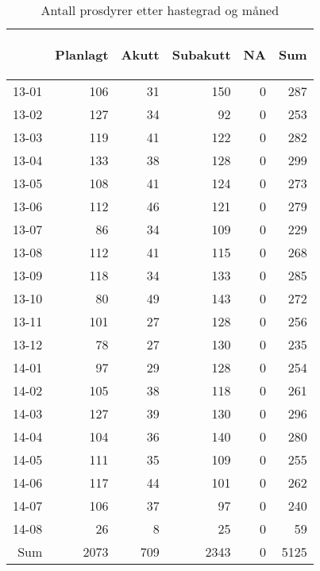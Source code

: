 \documentclass[presentation,xcolor=pdftex,dvipsnames,table]{beamer}
\begin{document}
\begin{frame}
\begin{tiny}
\begin{table}[ht]
\centering
\begin{tabular}{rrrrrr}
  \toprule
 & \begin{sideways} Planlagt \end{sideways} & \begin{sideways} Akutt \end{sideways} & \begin{sideways} Subakutt \end{sideways} & \begin{sideways} NA \end{sideways} & \begin{sideways} Sum \end{sideways} \\ 
  \midrule
13-01 & 106 & 31 & 150 & 0 & 287 \\ 
  13-02 & 127 & 34 & 92 & 0 & 253 \\ 
  13-03 & 119 & 41 & 122 & 0 & 282 \\ 
  13-04 & 133 & 38 & 128 & 0 & 299 \\ 
  13-05 & 108 & 41 & 124 & 0 & 273 \\ 
  13-06 & 112 & 46 & 121 & 0 & 279 \\ 
  13-07 & 86 & 34 & 109 & 0 & 229 \\ 
  13-08 & 112 & 41 & 115 & 0 & 268 \\ 
  13-09 & 118 & 34 & 133 & 0 & 285 \\ 
  13-10 & 80 & 49 & 143 & 0 & 272 \\ 
  13-11 & 101 & 27 & 128 & 0 & 256 \\ 
  13-12 & 78 & 27 & 130 & 0 & 235 \\ 
  14-01 & 97 & 29 & 128 & 0 & 254 \\ 
  14-02 & 105 & 38 & 118 & 0 & 261 \\ 
  14-03 & 127 & 39 & 130 & 0 & 296 \\ 
  14-04 & 104 & 36 & 140 & 0 & 280 \\ 
  14-05 & 111 & 35 & 109 & 0 & 255 \\ 
  14-06 & 117 & 44 & 101 & 0 & 262 \\ 
  14-07 & 106 & 37 & 97 & 0 & 240 \\ 
  14-08 & 26 & 8 & 25 & 0 & 59 \\ 
  Sum & 2073 & 709 & 2343 & 0 & 5125 \\ 
   \bottomrule
\end{tabular}
\caption{Antall prosdyrer etter hastegrad og måned} 
\end{table}\end{tiny}
\end{frame}
\end{document}
